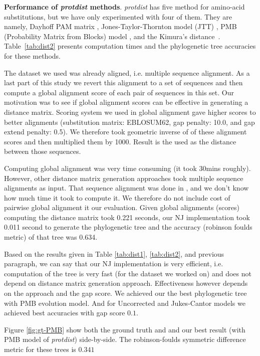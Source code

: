 \documentclass[11pt,letterpaper]{article}
\theoremstyle{definition}
\begin{document}
\textbf{Performance of \textit{protdist} methods}. \textit{protdist} has five method for amino-acid substitutions, but we have only experimented with four of them. They are namely, Dayhoff PAM matrix \cite{kosiol2005different}, Jones-Taylor-Thornton model (JTT) \cite{jones1992rapid}, PMB (Probability Matrix from Blocks) model \cite{veerassamy2003transition}, and the Kimura's distance~\cite{kimura1983rare}. Table~\ref{tab:dist2} presents computation times and the phylogenetic tree accuracies for these methods.

The dataset we used was already aligned, i.e. multiple sequence alignment. As a last part of this study we revert this alignment to a set of sequences and then compute a global alignment score of each pair of sequences in this set. Our motivation was to see if global alignment scores can be effective in generating a distance matrix. Scoring system we used in global alignment gave higher scores to better alignments (substitution matrix: EBLOSUM62, gap penalty: 10.0, and gap extend penalty: 0.5). We therefore took geometric inverse of of these alignment scores and then multiplied them by 1000. Result is the used as the distance between those sequences.

Computing global alignment was very time consuming (it took 30mins roughly). However, other distance matrix generation approaches took multiple sequence alignments as input. That sequence alignment was done in \cite{khafif2014identification}, and we don't know how much time it took to compute it. We therefore do not include cost of pairwise global alignment it our evaluation. Given global alignments (scores) computing the distance matrix took 0.221 seconds, our NJ implementation took 0.011 second to generate the phylogenetic tree and the accuracy (robinson foulds metric) of that tree was 0.634.

Based on the results given in Table \ref{tab:dist1}, \ref{tab:dist2}, and previous paragraph, we can say that our NJ implementation is very efficient, i.e. computation of the tree is very fast (for the dataset we worked on) and does not depend on distance matrix generation approach. Effectiveness however depends on the approach and the gap score. We achieved our the best phylogenetic tree with PMB evolution model. And for Uncorrected and Jukes-Cantor models we achieved best accuracies with gap score $0.1$.

Figure \ref{fig:gt-PMB} show both the ground truth and and our best result (with PMB model of \textit{protdist}) side-by-side. The robinson-foulds symmetric difference metric for these trees is $0.341$
\end{document}
